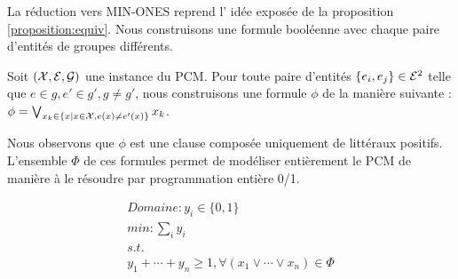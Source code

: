 La réduction vers MIN-ONES reprend l' idée exposée de la proposition \ref{proposition:equiv}. Nous construisons une formule booléenne avec chaque paire d'entités de groupes différents.

Soit $({\cal X}, {\cal E}, {\cal G})$ une instance du PCM.
Pour toute paire d'entités $\{e_i,e_j\}\in {\cal E}^2$ telle que $e\in g,e'\in
g',g\neq g'$, nous construisons une formule $\phi$ de la manière suivante :\\
$\phi=\bigvee_{x_k \in \{x|x \in {\cal X}, e(x) \neq e'(x)\}} x_k $.

Nous observons que $\phi$ est une clause composée uniquement de littéraux positifs. L'ensemble $\Phi$ de ces formules permet de modéliser entièrement le PCM de manière à le résoudre par programmation entière 0/1.

\begin{center}
\[\begin{array}{l}
Domaine : y_i \in \{0,1\}\\
min : \sum_i y_i\\
s.t.\\
  y_{1}+\cdots+y_{n} \geq 1, \forall(x_{1}\vee\cdots\vee x_{n}) \in
\Phi\\
\end{array}\]
\end{center}

